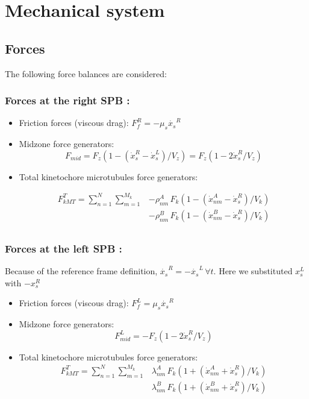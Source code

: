 \documentclass[a4paper,12pt]{article}
\begin{document}
\section{Mechanical system}

\subsection{Forces}

The following force balances are considered:


\subsubsection{Forces at the right SPB :}


\begin{itemize}
\item Friction forces (viscous drag):  $F_f^R = -\mu_s \dot{x_s}^R$
\item Midzone force generators:
  $$F_{mid} = F_z\left(1 - (\dot{x}^R_s - \dot{x}_s^L)/V_z\right) =
  F_z\left(1 - 2\dot{x}^R_s / V_z\right) $$
\item Total kinetochore microtubules force generators:

$$
\begin{aligned}
  F_{kMT}^T = \sum_{n = 1}^{N}\sum_{m = 1}^{M_k} & - \rho_{nm}^A\,F_k\left( 1 -
    (\dot{x}^A_{nm} - \dot{x}^R_s)/V_k\right)\\
  & - \rho_{nm}^B\,F_k\left( 1 -
    (\dot{x}^B_{nm} - \dot{x}^R_s)/V_k\right)\\
\end{aligned}
$$

\end{itemize}


\subsubsection{Forces at the left SPB :}

Because of the reference frame definition, $\dot{x_s}^R =
-\dot{x_s}^L\,\forall t$. Here we substituted $x_s^L$ with $-x_s^R$
\begin{itemize}
\item Friction forces (viscous drag):  $F_f^L = \mu_s \dot{x_s}^R$
\item Midzone force generators:
  $$F_{mid}^L = - F_z\left(1 - 2\dot{x}^R_s / V_z\right) $$
\item Total kinetochore microtubules force generators:
$$  \begin{aligned}
    F_{kMT}^T = \sum_{n = 1}^{N}\sum_{m = 1}^{M_k} &  \lambda_{nm}^A\,F_k\left(1 +
      (\dot{x}^A_{nm} + \dot{x}^R_s)/V_k\right)\\
    & \lambda_{nm}^B\,F_k\left(1 +
      (\dot{x}^B_{nm} + \dot{x}^R_s)/V_k\right)
  \end{aligned}
$$
\end{itemize}
\end{document}
